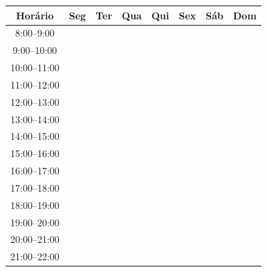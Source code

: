 \documentclass{letter}
\begin{document}
\begin{letter}{}
\vspace{.5em}


\begin{center}
\begin{tabular}{|c|c|c|c|c|c|c|c|}
\hline 
Horário & Seg & Ter & Qua & Qui & Sex & Sáb & Dom\tabularnewline
\hline 
\hline 
8:00--9:00 &  &  &  &  &  &  & \tabularnewline
\hline 
9:00--10:00 &  &  &  &  &  &  & \tabularnewline
\hline 
10:00--11:00 &  &  &  &  &  &  & \tabularnewline
\hline 
11:00--12:00 &  &  &  &  &  &  & \tabularnewline
\hline 
12:00--13:00 &  &  &  &  &  &  & \tabularnewline
\hline 
13:00--14:00 &  &  &  &  &  &  & \tabularnewline
\hline 
14:00--15:00 &  &  &  &  &  &  & \tabularnewline
\hline 
15:00--16:00 &  &  &  &  &  &  & \tabularnewline
\hline 
16:00--17:00 &  &  &  &  &  &  & \tabularnewline
\hline 
17:00--18:00 &  &  &  &  &  &  & \tabularnewline
\hline 
18:00--19:00 &  &  &  &  &  &  & \tabularnewline
\hline 
19:00--20:00 &  &  &  &  &  &  & \tabularnewline
\hline 
20:00--21:00 &  &  &  &  &  &  & \tabularnewline
\hline 
21:00--22:00 &  &  &  &  &  &  & \tabularnewline
\hline 
\end{tabular}
\end{center}
\end{letter}
\end{document}

